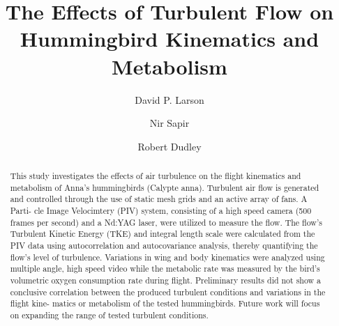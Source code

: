 \documentclass[10pt]{llncs}
\title{The Effects of Turbulent Flow on Hummingbird Kinematics and Metabolism}
\author{
    David P. Larson
    \and 
    Nir Sapir
    \and 
    Robert Dudley
}
\institute{
    \textit{Department of Integrative Biology, University of California, Berkeley}
    \\[0.25cm]
    Summer 2011
}
\begin{document}
\maketitle

\begin{abstract}
This study investigates the effects of air turbulence on the flight kinematics and metabolism of Anna’s hummingbirds (Calypte anna). Turbulent air flow is generated and controlled through the use of static mesh grids and an active array of fans. A Parti- cle Image Velocimtery (PIV) system, consisting of a high speed camera (500 frames per second) and a Nd:YAG laser, were utilized to measure the flow. The flow’s Turbulent Kinetic Energy (TKE) and integral length scale were calculated from the PIV data using autocorrelation and autocovariance analysis, thereby quantifying the flow’s level of turbulence. Variations in wing and body kinematics were analyzed using multiple angle, high speed video while the metabolic rate was measured by the bird’s volumetric oxygen consumption rate during flight. Preliminary results did not show a conclusive correlation between the produced turbulent conditions and variations in the flight kine- matics or metabolism of the tested hummingbirds. Future work will focus on expanding the range of tested turbulent conditions.
\end{abstract}
\end{document}
